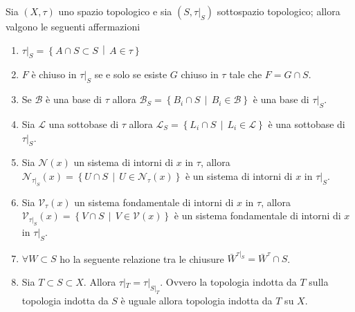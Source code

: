 \begin{theorem}
	\label{thr:proprieties_induced_top}
	Sia $(X,\tau)$ uno spazio topologico e sia $(S, \tau|_S)$ sottospazio topologico; allora valgono le seguenti affermazioni
	\begin{enumerate}
		\item $\tau|_S = \left\{A \cap S \subset S \,\middle|\, A \in \tau \right\}$
		\item $F$ è chiuso in $\tau|_S$ se e solo se esiste $G$ chiuso in $\tau$ tale che $F = G \cap S$.
		\item Se $\mathcal{B}$ è una base di $\tau$ allora $\mathcal{B}_S = \left\{B_i \cap S \,\middle|\, B_i \in \mathcal{B}\right\}$ è una base di $\tau|_S$.
		\item Sia $\mathcal{L}$ una sottobase di $\tau$ allora $\mathcal{L}_S = \left\{ L_i \cap S \,\middle|\, L_i \in \mathcal{L}\right\}$ è una sottobase di $\tau|_S$.
		\item Sia $\mathcal{N}(x)$ un sistema di intorni di $x$ in $\tau$, allora $\mathcal{N}_{\tau|_S}(x) = \left\{U \cap S \,\middle|\, U \in \mathcal{N}_\tau(x)\right\}$ è un sistema di intorni di $x$ in $\tau|_S$.
		\item Sia $\mathcal{V}_\tau(x)$ un sistema fondamentale di intorni di $x$ in $\tau$, allora $\mathcal{V}_{\tau|_S}(x) = \left\{ V \cap S \,\middle|\, V \in \mathcal{V}(x)\right\}$ è un sistema fondamentale di intorni di $x$ in $\tau|_S$.
		\item $\forall W \subset S$ ho la seguente relazione tra le chiusure $\bar{W}^{\tau|_S} = \bar{W}^{\tau} \cap S$.
		\item Sia $T \subset S \subset X$. Allora $\tau|_T = \tau|_{S|_T}$. Ovvero la topologia indotta da $T$ sulla topologia indotta da $S$ è uguale allora topologia indotta da $T$ su $X$.
	\end{enumerate}
\end{theorem}
